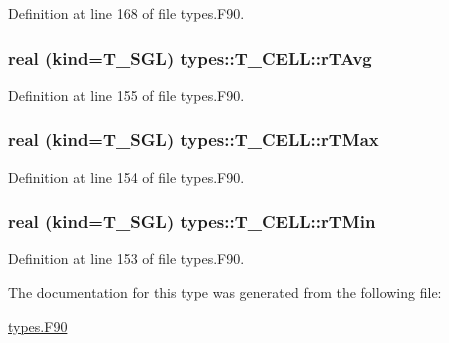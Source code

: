 Definition at line 168 of file types.F90.

\hypertarget{typetypes_1_1_t___c_e_l_l_ae7d215233d7fd0ea9d5b2fbd3a4fe8b3}{
\subsubsection[{rTAvg}]{\setlength{\rightskip}{0pt plus 5cm}real (kind={\bf T\_\-SGL}) {\bf types::T\_\-CELL::rTAvg}}}
\label{typetypes_1_1_t___c_e_l_l_ae7d215233d7fd0ea9d5b2fbd3a4fe8b3}


Definition at line 155 of file types.F90.

\hypertarget{typetypes_1_1_t___c_e_l_l_a550cda256cb70da1d3648ffc0f40363e}{
\subsubsection[{rTMax}]{\setlength{\rightskip}{0pt plus 5cm}real (kind={\bf T\_\-SGL}) {\bf types::T\_\-CELL::rTMax}}}
\label{typetypes_1_1_t___c_e_l_l_a550cda256cb70da1d3648ffc0f40363e}


Definition at line 154 of file types.F90.

\hypertarget{typetypes_1_1_t___c_e_l_l_a806f1f12b64f811d0100cf0fe1bd1b29}{
\subsubsection[{rTMin}]{\setlength{\rightskip}{0pt plus 5cm}real (kind={\bf T\_\-SGL}) {\bf types::T\_\-CELL::rTMin}}}
\label{typetypes_1_1_t___c_e_l_l_a806f1f12b64f811d0100cf0fe1bd1b29}


Definition at line 153 of file types.F90.



The documentation for this type was generated from the following file:\begin{DoxyCompactItemize}
\item 
\hyperlink{types_8_f90}{types.F90}\end{DoxyCompactItemize}
